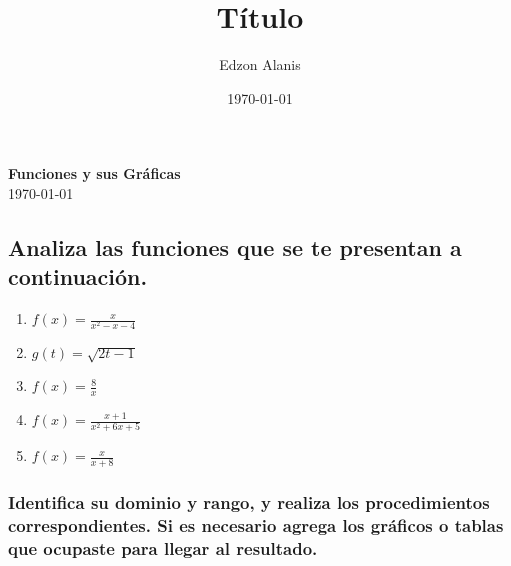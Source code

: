 \documentclass[12pt]{article}
\title{Título}
\author{Edzon Alanis}
\date{\today}
\begin{document}
\begin{center}
    \textbf{\large Funciones y sus Gráficas} \\[0.5 cm]
    \today
\end{center}
\subsection*{Analiza las funciones que se te presentan a continuación.}

\begin{enumerate}
    \item $\displaystyle{f(x) = \frac{x}{x^2-x-4}}$
    \item $\displaystyle{g(t) = \sqrt{2t-1}}$
    \item $\displaystyle{f(x) = \frac{8}{x}}$
    \item $\displaystyle{f(x) = \frac{x+1}{x^2+6x+5}}$
    \item $\displaystyle{f(x) = \frac{x}{x+8}}$
\end{enumerate}

\subsubsection*{Identifica su dominio y rango, y realiza los procedimientos correspondientes. Si es necesario agrega los gráficos o tablas que ocupaste para llegar al resultado.}
\end{document}
